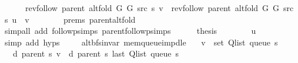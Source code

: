 \begin{isabellebody}
\ \ \ \ \ \ {\isachardoublequoteopen}rev{\isacharunderscore}{\kern0pt}follow\ {\isacharparenleft}{\kern0pt}parent\ {\isacharparenleft}{\kern0pt}alt{\isacharunderscore}{\kern0pt}fold\ G{}\ G{}\ src\ s{\isacharparenright}{\kern0pt}{\isacharparenright}{\kern0pt}\ v\ {\isacharequal}{\kern0pt}\ rev{\isacharunderscore}{\kern0pt}follow\ {\isacharparenleft}{\kern0pt}parent\ {\isacharparenleft}{\kern0pt}alt{\isacharunderscore}{\kern0pt}fold\ G{}\ G{}\ src\ s{\isacharparenright}{\kern0pt}{\isacharparenright}{\kern0pt}\ u\ {\isacharat}{\kern0pt}\ {\isacharbrackleft}{\kern0pt}v{\isacharbrackright}{\kern0pt}{\isachardoublequoteclose}\isanewline
\ \ \ \ \ \ \isamarkupfalse%
\ {\isachardoublequoteopen}{}{\isachardot}{\kern0pt}prems{\isachardoublequoteclose}{\isacharparenleft}{\kern0pt}{}{\isacharparenright}{\kern0pt}\ parent{\isacharunderscore}{\kern0pt}alt{\isacharunderscore}{\kern0pt}fold\isanewline
\ \ \ \ \ \ \isamarkupfalse%
\ {\isacharparenleft}{\kern0pt}simp{\isacharunderscore}{\kern0pt}all\ add{\isacharcolon}{\kern0pt}\ follow{\isacharunderscore}{\kern0pt}psimps\ parent{\isachardot}{\kern0pt}follow{\isacharunderscore}{\kern0pt}psimps{\isacharparenright}{\kern0pt}\isanewline
\ \ \ \ \isamarkupfalse%
\ {\isacharquery}{\kern0pt}thesis\isanewline
\ \ \ \ \ \ \isamarkupfalse%
\ u\isanewline
\ \ \ \ \ \ \isamarkupfalse%
\ {\isacharparenleft}{\kern0pt}simp\ add{\isacharcolon}{\kern0pt}\ {\isachardoublequoteopen}{}{\isachardot}{\kern0pt}hyps{\isachardoublequoteclose}{\isacharparenright}{\kern0pt}\isanewline
\ \ \isamarkupfalse%
\isanewline
{}\isamarkupfalse%
%
\endisatagproof
{\isafoldproof}%
%
\isadelimproof
\isanewline
%
\endisadelimproof
%
\isadeliminvisible
\isanewline
%
\endisadeliminvisible
%
\isataginvisible
{}\isamarkupfalse%
\ {\isacharparenleft}{\kern0pt}\ alt{\isacharunderscore}{\kern0pt}bfs{\isacharunderscore}{\kern0pt}invar{\isacharparenright}{\kern0pt}\ mem{\isacharunderscore}{\kern0pt}queue{\isacharunderscore}{\kern0pt}imp{\isacharunderscore}{\kern0pt}d{\isacharunderscore}{\kern0pt}le{\isacharcolon}{\kern0pt}\isanewline
\ \ \ {\isachardoublequoteopen}v\ {\isasymin}\ set\ {\isacharparenleft}{\kern0pt}Q{\isacharunderscore}{\kern0pt}list\ {\isacharparenleft}{\kern0pt}queue\ s{\isacharparenright}{\kern0pt}{\isacharparenright}{\kern0pt}{\isachardoublequoteclose}\isanewline
\ \ \ {\isachardoublequoteopen}d\ {\isacharparenleft}{\kern0pt}parent\ s{\isacharparenright}{\kern0pt}\ v\ {\isasymle}\ d\ {\isacharparenleft}{\kern0pt}parent\ s{\isacharparenright}{\kern0pt}\ {\isacharparenleft}{\kern0pt}last\ {\isacharparenleft}{\kern0pt}Q{\isacharunderscore}{\kern0pt}list\ {\isacharparenleft}{\kern0pt}queue\ s{\isacharparenright}{\kern0pt}{\isacharparenright}{\kern0pt}{\isacharparenright}{\kern0pt}{\isachardoublequoteclose}%

\end{isabellebody}
